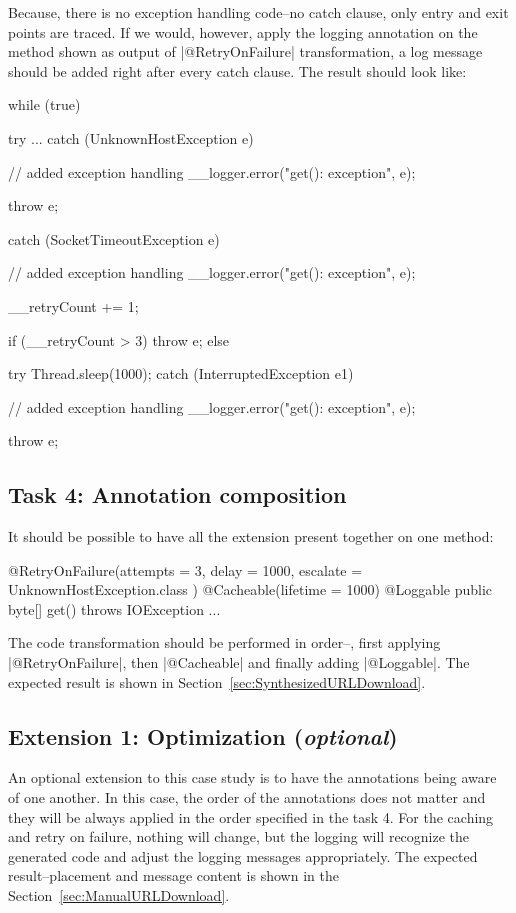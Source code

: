 Because, there is no exception handling code--\Ie no catch clause, only entry and exit points are traced.
If we would, however, apply the logging annotation on the method shown as output of \javainline|@RetryOnFailure| transformation, a log message should be added right after every catch clause.
The result should look like:
%
\begin{javacode}
while (true) {
  try {
    ...
  } catch (UnknownHostException e) {
    // added exception handling
    __logger.error("get(): exception", e);

    throw e;
  } catch (SocketTimeoutException e) {
    // added exception handling
    __logger.error("get(): exception", e);

    __retryCount += 1;

    if (__retryCount > 3) {
      throw e;
    } else {
      try {
        Thread.sleep(1000);
      } catch (InterruptedException e1) {
        // added exception handling
        __logger.error("get(): exception", e);

        throw e;
      }
    }
  }
}
\end{javacode}

\subsection{Task 4: Annotation composition}

It should be possible to have all the extension present together on one method:
%
\begin{javacode}
@RetryOnFailure(attempts = 3, delay = 1000, escalate = { UnknownHostException.class })
@Cacheable(lifetime = 1000)
@Loggable
public byte[] get() throws IOException { ... }
\end{javacode}

The code transformation should be performed in order--\Ie, first applying \javainline|@RetryOnFailure|, then \javainline|@Cacheable| and finally adding \javainline|@Loggable|.
The expected result is shown in Section~\ref{sec:SynthesizedURLDownload}.

\subsection{Extension 1: Optimization (\emph{optional})}

An optional extension to this case study is to have the annotations being aware of one another.
In this case, the order of the annotations does not matter and they will be always applied in the order specified in the task 4.
For the caching and retry on failure, nothing will change, but the logging will recognize the generated code and adjust the logging messages appropriately.
The expected result--\Ie placement and message content is shown in the Section~\ref{sec:ManualURLDownload}.